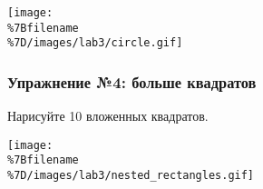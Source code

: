 \texttt{[image: \\\%7Bfilename\\\%7D/images/lab3/circle.gif]}

\begin{Shaded}
\begin{Highlighting}[]
 
 

\OperatorTok{=} 
\OperatorTok{=} 
\OperatorTok{=} \OperatorTok{*}\OperatorTok{*}\OperatorTok{/}
\OperatorTok{=} \OperatorTok{*}\NormalTok{(}\OperatorTok{/}

\OperatorTok{-}\OperatorTok{/}\NormalTok{)}

  
    \OperatorTok{-}
\end{Highlighting}
\end{Shaded}

\subsubsection{Упражнение №4: больше
квадратов}\label{ux443ux43fux440ux430ux436ux43dux435ux43dux438ux435-4-ux431ux43eux43bux44cux448ux435-ux43aux432ux430ux434ux440ux430ux442ux43eux432}

Нарисуйте 10 вложенных квадратов.

\texttt{[image: \\\%7Bfilename\\\%7D/images/lab3/nested\_rectangles.gif]}

\begin{Shaded}
\begin{Highlighting}[]
 

\OperatorTok{=} 
  \NormalTok{(}\NormalTok{):}
    \OperatorTok{-}\OperatorTok{/}\NormalTok{, }\OperatorTok{-}\OperatorTok{/}\NormalTok{)}
      \NormalTok{(}\NormalTok{):}
        \NormalTok{)}
    \OperatorTok{+=} 
\end{Highlighting}
\end{Shaded}


